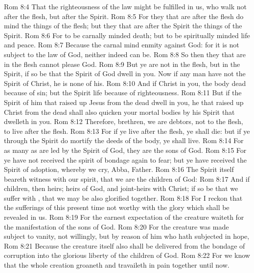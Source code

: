 \vs Rom 8:4 That the righteousness of the law might be fulfilled in us, who walk not after the flesh, but after the Spirit.
\vs Rom 8:5 For they that are after the flesh do mind the things of the flesh; but they that are after the Spirit the things of the Spirit.
\vs Rom 8:6 For to be carnally minded  death; but to be spiritually minded  life and peace.
\vs Rom 8:7 Because the carnal mind  enmity against God: for it is not subject to the law of God, neither indeed can be.
\vs Rom 8:8 So then they that are in the flesh cannot please God.
\vs Rom 8:9 But ye are not in the flesh, but in the Spirit, if so be that the Spirit of God dwell in you. Now if any man have not the Spirit of Christ, he is none of his.
\vs Rom 8:10 And if Christ  in you, the body  dead because of sin; but the Spirit  life because of righteousness.
\vs Rom 8:11 But if the Spirit of him that raised up Jesus from the dead dwell in you, he that raised up Christ from the dead shall also quicken your mortal bodies by his Spirit that dwelleth in you.
\vs Rom 8:12 Therefore, brethren, we are debtors, not to the flesh, to live after the flesh.
\vs Rom 8:13 For if ye live after the flesh, ye shall die: but if ye through the Spirit do mortify the deeds of the body, ye shall live.
\vs Rom 8:14 For as many as are led by the Spirit of God, they are the sons of God.
\vs Rom 8:15 For ye have not received the spirit of bondage again to fear; but ye have received the Spirit of adoption, whereby we cry, Abba, Father.
\vs Rom 8:16 The Spirit itself beareth witness with our spirit, that we are the children of God:
\vs Rom 8:17 And if children, then heirs; heirs of God, and joint-heirs with Christ; if so be that we suffer with , that we may be also glorified together.
\vs Rom 8:18 For I reckon that the sufferings of this present time  not worthy  with the glory which shall be revealed in us.
\vs Rom 8:19 For the earnest expectation of the creature waiteth for the manifestation of the sons of God.
\vs Rom 8:20 For the creature was made subject to vanity, not willingly, but by reason of him who hath subjected  in hope,
\vs Rom 8:21 Because the creature itself also shall be delivered from the bondage of corruption into the glorious liberty of the children of God.
\vs Rom 8:22 For we know that the whole creation groaneth and travaileth in pain together until now.
